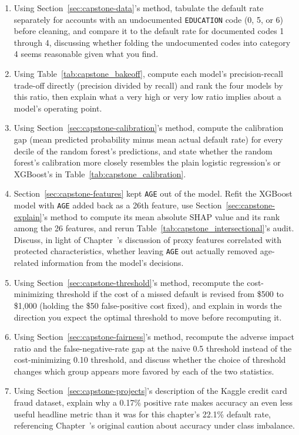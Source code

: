 \documentclass[../ai_in_finance]{subfiles}
\begin{document}
\begin{enumerate}[exercises]
    \item Using Section~\ref{sec:capstone-data}'s method, tabulate the default rate separately for accounts with an undocumented \texttt{EDUCATION} code (0, 5, or 6) before cleaning, and compare it to the default rate for documented codes 1 through 4, discussing whether folding the undocumented codes into category 4 seems reasonable given what you find.
    \item Using Table~\ref{tab:capstone_bakeoff}, compute each model's precision-recall trade-off directly (precision divided by recall) and rank the four models by this ratio, then explain what a very high or very low ratio implies about a model's operating point.
    \item Using Section~\ref{sec:capstone-calibration}'s method, compute the calibration gap (mean predicted probability minus mean actual default rate) for every decile of the random forest's predictions, and state whether the random forest's calibration more closely resembles the plain logistic regression's or XGBoost's in Table~\ref{tab:capstone_calibration}.
    \item Section~\ref{sec:capstone-features} kept \texttt{AGE} out of the model. Refit the XGBoost model with \texttt{AGE} added back as a 26th feature, use Section~\ref{sec:capstone-explain}'s method to compute its mean absolute SHAP value and its rank among the 26 features, and rerun Table~\ref{tab:capstone_intersectional}'s audit. Discuss, in light of Chapter~'s discussion of proxy features correlated with protected characteristics, whether leaving \texttt{AGE} out actually removed age-related information from the model's decisions.
    \item Using Section~\ref{sec:capstone-threshold}'s method, recompute the cost-minimizing threshold if the cost of a missed default is revised from \$500 to \$1{,}000 (holding the \$50 false-positive cost fixed), and explain in words the direction you expect the optimal threshold to move before recomputing it.
    \item Using Section~\ref{sec:capstone-fairness}'s method, recompute the adverse impact ratio and the false-negative-rate gap at the naive 0.5 threshold instead of the cost-minimizing 0.10 threshold, and discuss whether the choice of threshold changes which group appears more favored by each of the two statistics.
    \item Using Section~\ref{sec:capstone-projects}'s description of the Kaggle credit card fraud dataset, explain why a 0.17\% positive rate makes accuracy an even less useful headline metric than it was for this chapter's 22.1\% default rate, referencing Chapter~'s original caution about accuracy under class imbalance.

\end{enumerate}
\end{document}
